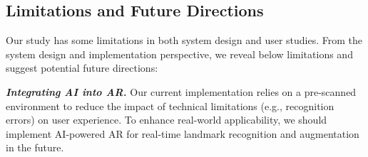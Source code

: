 


\subsection{Limitations and Future Directions}
Our study has some limitations in both system design and user studies. From the system design and implementation perspective, we reveal below limitations and suggest potential future directions:

\textbf{\textit{Integrating AI into AR.}} Our current implementation relies on a pre-scanned environment to reduce the impact of technical limitations (e.g., recognition errors) on user experience. To enhance real-world applicability, we should implement AI-powered AR for real-time landmark recognition and augmentation in the future. 

